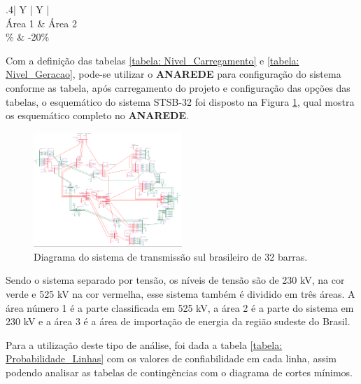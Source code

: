 \documentclass[lettersize,journal]{IEEEtran}
\begin{document}
\begin{table}[ht]
	\caption{Configuração do Nível de Carregamento(MW)}
	\label{tabela: Nivel_Geracao}
	\centering
	\begin{tabularx}{.4\textwidth}{| Y | Y |}
		\hline
		 \\
		\hline
		Área 1 & Área 2 \\
		\% & -20\% \\
		\hline
	\end{tabularx}
\end{table}

Com a definição das tabelas \ref{tabela: Nivel_Carregamento} e \ref{tabela: Nivel_Geracao}, pode-se utilizar o \textbf{ANAREDE} para configuração do sistema conforme as tabela, após carregamento do projeto e configuração das opções das tabelas, o esquemático do sistema STSB-32 foi disposto na Figura \ref{figura: Sistema_STSB_32}, qual mostra os esquemático completo no \textbf{ANAREDE}.

\begin{figure}[h]
	\includegraphics[width=0.5\textwidth]{Figuras/STSB-32.png}
	\centering
	\caption{Diagrama do sistema de transmissão sul brasileiro de 32 barras.}
	\label{figura: Sistema_STSB_32}
\end{figure}

Sendo o sistema separado por tensão, os níveis de tensão são de 230 kV, na cor verde e 525 kV na cor vermelha, esse sistema também é dividido em três áreas. A área número 1 é a parte classificada em 525 kV, a área 2 é a parte do sistema em 230 kV e a área 3 é a área de importação de energia da região sudeste do Brasil.

Para a utilização deste tipo de análise, foi dada a tabela \ref{tabela: Probabilidade_Linhas} com os valores de confiabilidade em cada linha, assim podendo analisar as tabelas de contingências com o diagrama de cortes mínimos.
\end{document}
